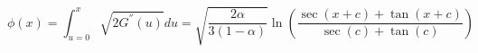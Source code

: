 \begin{equation}\label{phi}
    \phi(x) = \int_{u=0}^{x}\sqrt{2G^{''}(u)}du =
    \sqrt{\frac{2\alpha}{3(1-\alpha)}}\ln{(\frac{\sec(x+c)+\tan(x+c)}{\sec(c)+ \tan(c)})}
\end{equation}

